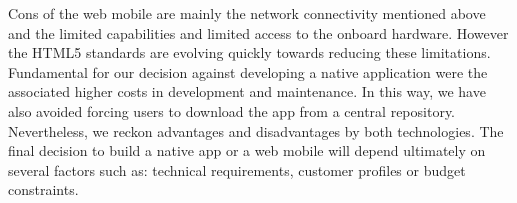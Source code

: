 Cons of the web mobile are mainly the network connectivity mentioned
above and the limited capabilities and limited access to the onboard
hardware. However the HTML5 standards are evolving quickly towards
reducing these limitations. Fundamental for our decision against
developing a native application were the associated higher costs in
development and maintenance. In this way, we have also avoided forcing
users to download the app from a central repository.\\

Nevertheless, we reckon advantages and disadvantages by both
technologies. The final decision to build a native app or a web mobile
will depend ultimately on several factors such as: technical
requirements, customer profiles or budget constraints.


